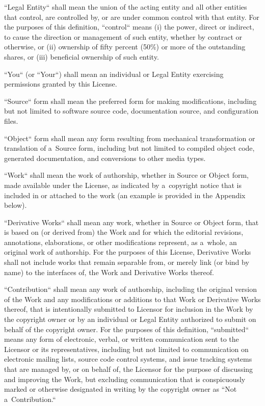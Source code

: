 \documentclass[a4paper, 11pt, twoside]{article}
\begin{document}
“Legal Entity“ shall mean the union of the acting entity and all other entities that control, are controlled by, or are under common control with that entity. For the purposes of this definition, “control“ means (i) the power, direct or indirect, to cause the direction or management of such entity, whether by contract or otherwise, or (ii) ownership of fifty percent (50\%) or more of the outstanding shares, or (iii) beneficial ownership of such entity.

“You“ (or “Your“) shall mean an individual or Legal Entity exercising permissions granted by this License.

“Source“ form shall mean the preferred form for making modifications, including but not limited to software source code, documentation source, and configuration files.

“Object“ form shall mean any form resulting from mechanical transformation or translation of a~Source form, including but not limited to compiled object code, generated documentation, and conversions to other media types.

“Work“ shall mean the work of authorship, whether in Source or Object form, made available under the License, as indicated by a~copyright notice that is included in or attached to the work (an example is provided in the Appendix below).

“Derivative Works“ shall mean any work, whether in Source or Object form, that is based on (or derived from) the Work and for which the editorial revisions, annotations, elaborations, or other modifications represent, as a~whole, an original work of authorship. For the purposes of this License, Derivative Works shall not include works that remain separable from, or merely link (or bind by name) to the interfaces of, the Work and Derivative Works thereof.

“Contribution“ shall mean any work of authorship, including the original version of the Work and any modifications or additions to that Work or Derivative Works thereof, that is intentionally submitted to Licensor for inclusion in the Work by the copyright owner or by an individual or Legal Entity authorized to submit on behalf of the copyright owner. For the purposes of this definition, “submitted“ means any form of electronic, verbal, or written communication sent to the Licensor or its representatives, including but not limited to communication on electronic mailing lists, source code control systems, and issue tracking systems that are managed by, or on behalf of, the Licensor for the purpose of discussing and improving the Work, but excluding communication that is conspicuously marked or otherwise designated in writing by the copyright owner as “Not a~Contribution.“
\end{document}
